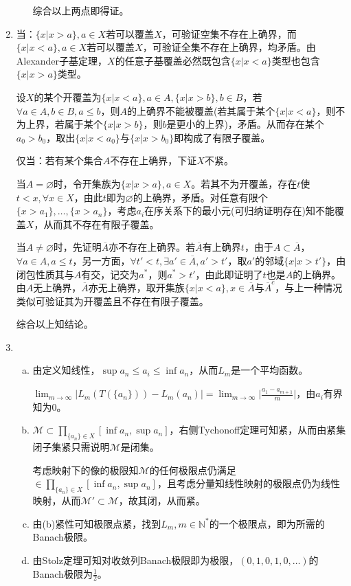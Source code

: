 \documentclass[a4paper,UTF8,fontset=windows]{ctexart}
\begin{document}
\begin{enumerate}[(1)]
\begin{enumerate}[(a)]
    综合以上两点即得证。
    \end{enumerate}
    
    \item
    当：$\{x|x>a\},a\in X$若可以覆盖$X$，可验证空集不存在上确界，而$\{x|x<a\},a\in X$若可以覆盖$X$，可验证全集不存在上确界，均矛盾。由Alexander子基定理，$X$的任意子基覆盖必然既包含$\{x|x<a\}$类型也包含$\{x|x>a\}$类型。
    
    设$X$的某个开覆盖为$\{x|x<a\},a\in A,\{x|x>b\},b\in B$，若$\forall a\in A,b\in B, a\le b$，则$A$的上确界不能被覆盖(若其属于某个$\{x|x<a\}$，则不为上界，若属于某个$\{x|x>b\}$，则$b$是更小的上界)，矛盾。从而存在某个$a_0>b_0$，取出$\{x|x<a_0\}$与$\{x|x>b_0\}$即构成了有限子覆盖。
    
    仅当：若有某个集合$A$不存在上确界，下证$X$不紧。
    
    当$A=\varnothing$时，令开集族为$\{x|x>a\},a\in X$。若其不为开覆盖，存在$t$使$t<x,\forall x\in X$，由此$t$即为$\varnothing$的上确界，矛盾。对任意有限个$\{x>a_1\},\dots,\{x>a_n\}$，考虑$a_i$在序关系下的最小元(可归纳证明存在)知不能覆盖$X$，从而其不存在有限子覆盖。
    
    当$A\ne\varnothing$时，先证明$\overline{A}$亦不存在上确界。若$\overline{A}$有上确界$t$，由于$A\subset\overline{A}$，$\forall a\in A,a\le t$，另一方面，$\forall t'<t, \exists a'\in\overline{A},a'>t'$，取$a'$的邻域$\{x|x>t'\}$，由闭包性质其与$A$有交，记交为$a^*$，则$a^*>t'$，由此即证明了$t$也是$A$的上确界。由$A$无上确界，$\overline{A}$亦无上确界，取开集族$\{x|x<a\},x\in\overline{A}$与$\overline{A}^c$，与上一种情况类似可验证其为开覆盖且不存在有限子覆盖。
    
    综合以上知结论。
    
    \item
    \begin{enumerate}[(a)]
    \item
    由定义知线性，$\sup a_n\le a_i\le\inf a_n$，从而$L_m$是一个平均函数。
    
    $\lim_{m\to\infty}|L_m(T(\{a_n\}))-L_m(a_n)|=\lim_{m\to\infty}\big|\frac{a_1-a_{m+1}}{m}\big|$，由$a_i$有界知为0。
    
    \item
    $\mathcal{M}\subset\prod_{\{a_n\}\in X}[\inf a_n,\sup a_n]$，右侧Tychonoff定理可知紧，从而由紧集闭子集紧只需说明$\mathcal{M}$是闭集。
    
    考虑映射下的像的极限知$\mathcal{M}$的任何极限点仍满足$\in\prod_{\{a_n\}\in X}[\inf a_n,\sup a_n]$，且考虑分量知线性映射的极限点仍为线性映射，从而$\mathcal{M}'\subset\mathcal{M}$，故其闭，从而紧。
    
    \item
    由(b)紧性可知极限点紧，找到$L_m,m\in\mathbb{N}^*$的一个极限点，即为所需的Banach极限。
    
    \item
    由Stolz定理可知对收敛列Banach极限即为极限，$(0,1,0,1,0,\dots)$的Banach极限为$\frac{1}{2}$。
    \end{enumerate}
\end{enumerate}
\end{document}
